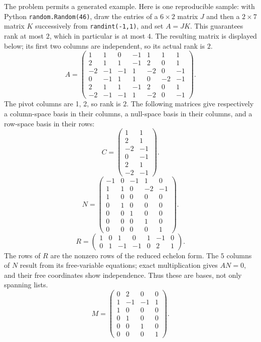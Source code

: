 The problem permits a generated example. Here is one reproducible sample: with Python \texttt{random.Random(46)}, draw the entries of a $6\times2$ matrix $J$ and then a $2\times7$ matrix $K$ successively from \texttt{randint(-1,1)}, and set $A=JK$. This guarantees rank at most $2$, which in particular is at most $4$. The resulting matrix is displayed below; its first two columns are independent, so its actual rank is $2$.
\[ A=\begin{pmatrix}1&1&0&-1&1&1&1\\2&1&1&-1&2&0&1\\-2&-1&-1&1&-2&0&-1\\0&-1&1&1&0&-2&-1\\2&1&1&-1&2&0&1\\-2&-1&-1&1&-2&0&-1\end{pmatrix}.\]
The pivot columns are 1, 2, so rank is $2$. The following matrices give respectively a column-space basis in their columns, a null-space basis in their columns, and a row-space basis in their rows:
\[ C=\begin{pmatrix}1&1\\2&1\\-2&-1\\0&-1\\2&1\\-2&-1\end{pmatrix}.\]
\[ N=\begin{pmatrix}-1&0&-1&1&0\\1&1&0&-2&-1\\1&0&0&0&0\\0&1&0&0&0\\0&0&1&0&0\\0&0&0&1&0\\0&0&0&0&1\end{pmatrix}.\]
\[ R=\begin{pmatrix}1&0&1&0&1&-1&0\\0&1&-1&-1&0&2&1\end{pmatrix}.\]
The rows of $R$ are the nonzero rows of the reduced echelon form. The $5$ columns of $N$ result from its free-variable equations; exact multiplication gives $AN=0$, and their free coordinates show independence. Thus these are bases, not only spanning lists.
\[ M=\begin{pmatrix}0&2&0&0\\1&-1&-1&1\\1&0&0&0\\0&1&0&0\\0&0&1&0\\0&0&0&1\end{pmatrix}.\]
